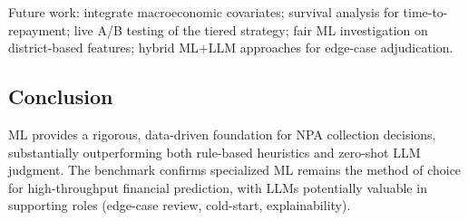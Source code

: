 \documentclass[12pt, a4paper]{article}
\begin{document}
Future work: integrate macroeconomic covariates; survival analysis for time-to-repayment; live A/B testing of the tiered strategy; fair ML investigation on district-based features; hybrid ML+LLM approaches for edge-case adjudication.

\subsection{Conclusion}

ML provides a rigorous, data-driven foundation for NPA collection decisions, substantially outperforming both rule-based heuristics and zero-shot LLM judgment. The benchmark confirms specialized ML remains the method of choice for high-throughput financial prediction, with LLMs potentially valuable in supporting roles (edge-case review, cold-start, explainability).
\end{document}
